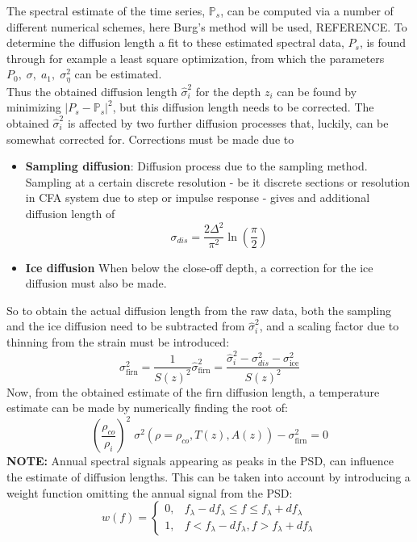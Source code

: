 \documentclass[11pt]{article}
\begin{document}
The spectral estimate of the time series, $\mathbb{P}_s$, can be computed via a number of different numerical schemes, here Burg's method will be used, REFERENCE. To determine the diffusion length a fit to these estimated spectral data, $P_s$, is found through for example a least square optimization, from which the parameters $P_0, \; \sigma, \; a_1, \; \sigma_{\eta}^2$ can be estimated.\\
Thus the obtained diffusion length $\hat{\sigma}_i^2$ for the depth $z_i$ can be found by minimizing $|P_s - \mathbb{P}_s|^2$, but this diffusion length needs to be corrected. The obtained $\hat{\sigma}_i^2$ is affected by two further diffusion processes that, luckily, can be somewhat corrected for. Corrections must be made due to 
\begin{itemize}
	\item \textbf{Sampling diffusion}: Diffusion process due to the sampling method. Sampling at a certain discrete resolution - be it discrete sections or resolution in CFA system due to step or impulse response - gives and additional diffusion length of
	\begin{equation}
		\sigma_{dis} = \frac{2 \Delta^2}{\pi^2}\ln\left(\frac{\pi}{2}\right)
		\label{eq:Diff_Len_corr_Discrete}
	\end{equation}
	\item \textbf{Ice diffusion} When below the close-off depth, a correction for the ice diffusion must also be made.
\end{itemize} 
So to obtain the actual diffusion length from the raw data, both the sampling and the ice diffusion need to be subtracted from $\hat{\sigma}_i^2$, and a scaling factor due to thinning from the strain must be introduced:
\begin{equation}
	\sigma_{\text{firn}}^2 = \frac{1}{S(z)^2}\hat{\sigma}_{\text{firn}}^2 = \frac{\hat{\sigma}_i^2 - \sigma_{dis}^2 - \sigma_{\text{ice}}^2}{S(z)^2}
	\label{eq:Diff_Len_Firn_Corrected}
\end{equation}
Now, from the obtained estimate of the firn diffusion length, a temperature estimate can be made by numerically finding the root of:
\begin{equation}
	\left(\frac{\rho_{co}}{\rho_i}\right)^2\;\sigma^2(\rho=\rho_{co}, T(z),A(z)) - \sigma_{\text{firn}}^2 = 0
	\label{eq:Firn_Temp_est_Roots}
\end{equation}
\textbf{NOTE:} Annual spectral signals appearing as peaks in the PSD, can influence the  estimate of diffusion lengths. This can be taken into account by introducing a weight function omitting the annual signal from the PSD:
\begin{equation}
	w(f) = \begin{cases}
			0, & f_{\lambda} - d f_{\lambda} \leq f \leq f_{\lambda} + d f_{\lambda} \\
			1, & f < f_{\lambda} - d f_{\lambda}, f > f_{\lambda} + d f_{\lambda}
	\end{cases}
\end{equation}
\end{document}
